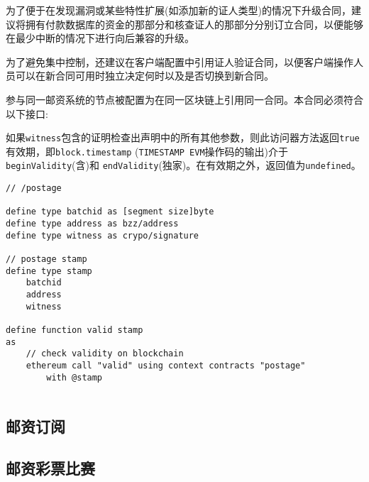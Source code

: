 为了便于在发现漏洞或某些特性扩展(如添加新的证人类型)的情况下升级合同，建议将拥有付款数据库的资金的那部分和核查证人的那部分分别订立合同，以便能够在最少中断的情况下进行向后兼容的升级。

为了避免集中控制，还建议在客户端配置中引用证人验证合同，以便客户端操作人员可以在新合同可用时独立决定何时以及是否切换到新合同。


参与同一邮资系统的节点被配置为在同一区块链上引用同一合同。本合同必须符合以下接口:

\begin{definition}\label{def:postage}

\end{definition}


如果\lstinline{witness}包含的证明检查出声明中的所有其他参数，则此访问器方法返回\lstinline{true} 
有效期，即\lstinline{block.timestamp} (\lstinline{TIMESTAMP EVM}操作码的输出)介于\lstinline{beginValidity}(含)和 
\lstinline{endValidity}(独家)。在有效期之外，返回值为\lstinline{undefined}。
 

\begin{definition}\label{def:postage-stamp}
\begin{lstlisting}[language=buzz1]
// /postage

define type batchid as [segment size]byte  
define type address as bzz/address
define type witness as crypo/signature

// postage stamp
define type stamp  
    batchid
    address
    witness

define function valid stamp
as 
    // check validity on blockchain
    ethereum call "valid" using context contracts "postage"
        with @stamp
        
\end{lstlisting}
\end{definition}

\subsection{邮资订阅}\label{spec:format:subscriptions}

\subsection{邮资彩票比赛}\label{spec:format:race}